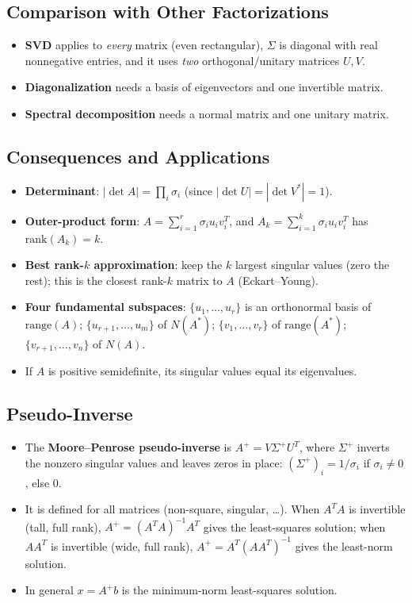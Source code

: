 \documentclass[hidelinks]{article}
\begin{document}
\subsection{Comparison with Other Factorizations}
\begin{itemize}
    \item \textbf{SVD} applies to \emph{every} matrix (even rectangular), $\Sigma$ is diagonal with real nonnegative entries, and it uses \emph{two} orthogonal/unitary matrices $U,V$.
    \item \textbf{Diagonalization} needs a basis of eigenvectors and one invertible matrix.
    \item \textbf{Spectral decomposition} needs a normal matrix and one unitary matrix.
\end{itemize}

\subsection{Consequences and Applications}
\begin{itemize}
    \item \textbf{Determinant}: $|\det A| = \prod_i \sigma_i$ (since $|\det U| = |\det V^{*}| = 1$).
    \item \textbf{Outer-product form}: $A = \sum_{i=1}^r \sigma_i u_i v_i^T$, and $A_k = \sum_{i=1}^k \sigma_i u_i v_i^T$ has $\mathrm{rank}(A_k) = k$.
    \item \textbf{Best rank-$k$ approximation}: keep the $k$ largest singular values (zero the rest); this is the closest rank-$k$ matrix to $A$ (Eckart--Young).
    \item \textbf{Four fundamental subspaces}: $\{u_1,\ldots,u_r\}$ is an orthonormal basis of $\mathrm{range}(A)$; $\{u_{r+1},\ldots,u_m\}$ of $N(A^{*})$; $\{v_1,\ldots,v_r\}$ of $\mathrm{range}(A^{*})$; $\{v_{r+1},\ldots,v_n\}$ of $N(A)$.
    \item If $A$ is positive semidefinite, its singular values equal its eigenvalues.
\end{itemize}

\subsection{Pseudo-Inverse}
\begin{itemize}
    \item The \textbf{Moore--Penrose pseudo-inverse} is $A^{+} = V\Sigma^{+}U^T$, where $\Sigma^{+}$ inverts the nonzero singular values and leaves zeros in place: $(\Sigma^{+})_i = 1/\sigma_i$ if $\sigma_i\neq 0$, else $0$.
    \item It is defined for all matrices (non-square, singular, \ldots). When $A^TA$ is invertible (tall, full rank), $A^{+} = (A^TA)^{-1}A^T$ gives the least-squares solution; when $AA^T$ is invertible (wide, full rank), $A^{+} = A^T(AA^T)^{-1}$ gives the least-norm solution.
    \item In general $x = A^{+}b$ is the minimum-norm least-squares solution.
\end{itemize}
\end{document}
